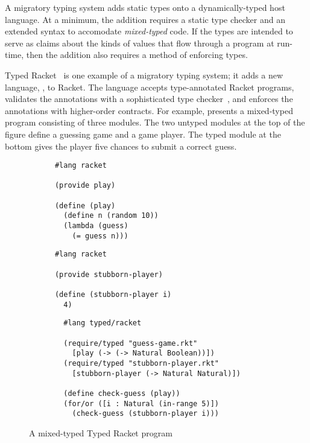A migratory typing system adds static types onto a
dynamically-typed host language.
At a minimum, the addition requires a static type checker and an extended
syntax to accomodate \emph{mixed-typed}\/ code.
If the types are intended to serve as claims about the kinds of values that
flow through a program at run-time, then the addition also requires a method
of enforcing types.

Typed Racket~\cite{tf-popl-2008} is one example of a migratory typing system; it adds
a new language, , to Racket.
The language accepts type-annotated Racket programs,
validates the annotations with a sophisticated type checker~\cite{tf-icfp-2010},
and enforces the annotations with higher-order contracts.
For example,  presents a mixed-typed
program consisting of three modules.
The two untyped modules at the top of the figure define a guessing game
and a game player.
The typed module at the bottom gives the player five chances to submit a
correct guess.

\begin{figure}[h]
  \begin{minipage}[t]{0.45\columnwidth}
    \begin{lstlisting}
      #lang racket

      (provide play)

      (define (play)
        (define n (random 10))
        (lambda (guess)
          (= guess n)))
    \end{lstlisting}

  \end{minipage}\begin{minipage}[t]{0.45\columnwidth}
    \begin{lstlisting}
      #lang racket

      (provide stubborn-player)

      (define (stubborn-player i)
        4)
    \end{lstlisting}

  \end{minipage}

  \bigskip
  \begin{centering}
    \begin{minipage}{0.6\columnwidth}
      \begin{lstlisting}
        #lang typed/racket

        (require/typed "guess-game.rkt"
          [play (-> (-> Natural Boolean))])
        (require/typed "stubborn-player.rkt"
          [stubborn-player (-> Natural Natural)])

        (define check-guess (play))
        (for/or ([i : Natural (in-range 5)])
          (check-guess (stubborn-player i)))
      \end{lstlisting}
    \end{minipage}
  \end{centering}

  \caption{A mixed-typed Typed Racket program~\cite{gtnffvf-jfp-2019}}
  \label{fig:guess-game}
\end{figure}

